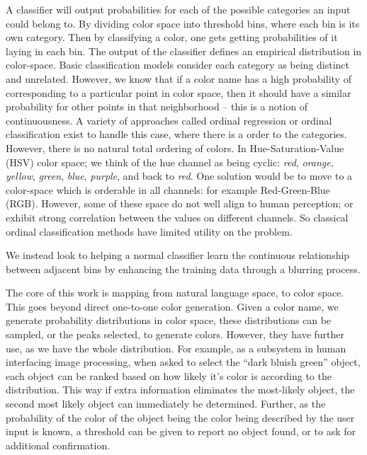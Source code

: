 \documentclass[11pt,letterpaper]{article}
\begin{document}
A classifier will output probabilities for each of the possible categories an input could belong to.
By dividing color space into threshold bins, where each bin is its own category.
Then by classifying a color, one gets getting probabilities of it laying in each bin. The output of the classifier defines an empirical distribution in color-space.
Basic classification models consider each category as being distinct and unrelated.
However, we know that if a color name has a high probability of corresponding to a particular point in color space, then it should have a similar probability for other points in that neighborhood -- this is a notion of continuousness.
A variety of approaches called ordinal regression or ordinal classification exist to handle this case, where there is a order to the categories.
However, there is no natural total ordering of colors.
In Hue-Saturation-Value (HSV) color space; we think of the hue channel 
 as being cyclic: \emph{red}, \emph{orange}, \emph{yellow}, \emph{green}, \emph{blue}, \emph{purple}, and back to \emph{red}.
One solution would be to move to a color-space which is orderable in all channels: for example Red-Green-Blue (RGB).
However, some of these space do not well align to human perception; or exhibit strong correlation between the values on different channels.
So classical ordinal classification methods have limited utility on the problem.

We instead look to helping a normal classifier learn the continuous relationship between adjacent bins by enhancing the training data through a blurring process.

The core of this work is mapping from natural language space, to color space.
This goes beyond direct one-to-one color generation.
Given a color name, we generate probability distributions in color space,
these distributions can be sampled, or the peaks selected, to generate colors.
However, they have further use, as we have the whole distribution.
For example, as a subsystem in human interfacing image processing, when asked to select the ``dark bluish green'' object, each object can be ranked based on how likely it's color is according to the distribution.
This way if extra information eliminates the most-likely object, the second most likely object can immediately be determined.
Further, as the probability of the color of the object being the color being described by the user input is known, a threshold can be given to report no object found, or to ask for additional confirmation.
\end{document}
